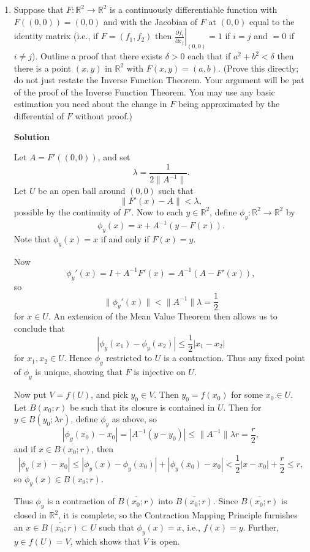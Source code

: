 \documentclass{article}
\begin{document}
\begin{enumerate}
\item Suppose that \(F : \mathbb{R}^2 \to \mathbb{R}^2\) is a continuously differentiable function with \(F((0,0)) = (0,0)\) and with the Jacobian of \(F\) at \((0,0)\) equal to the identity matrix (i.e., if \(F = (f_1, f_2)\) then \(\left. \frac{\partial f_i}{\partial x_j} \right|_{(0,0)} = 1\) if \(i = j\) and \( = 0\) if \(i \neq j\)).  Outline a proof that there exists \(\delta > 0\) each that if \(a^2 + b^2 < \delta\) then there is a point \((x,y)\) in \(\mathbb{R}^2\) with \(F(x,y) = (a,b)\).  (Prove this directly; do not just restate the Inverse Function Theorem.  Your argument will be pat of the proof of the Inverse Function Theorem.  You may use any basic estimation you need about the change in \(F\) being approximated by the differential of \(F\) without proof.)

{\bf Solution}

Let \(A = F'((0,0))\), and set
\[\lambda = \frac{1}{2\|A^{-1}\|}.\]
Let \(U\) be an open ball around \((0,0)\) such that
\[\|F'(x) - A\| < \lambda,\]
possible by the continuity of \(F'\).  Now to each \(y \in \mathbb{R}^2\), define \(\phi_y : \mathbb{R}^2 \to \mathbb{R}^2\) by
\[\phi_y(x) = x + A^{-1}(y - F(x)).\]
Note that \(\phi_y(x) = x\) if and only if \(F(x) = y\).

Now
\[\phi_y'(x) = I + A^{-1}F'(x) = A^{-1}(A - F'(x)),\]
so
\[\|\phi_y'(x)\| < \|A^{-1}\| \lambda = \frac{1}{2}\]
for \(x \in U\).  An extension of the Mean Value Theorem then allows us to conclude that
\[|\phi_y(x_1) - \phi_y(x_2)| \leq \frac{1}{2} |x_1 - x_2|\]
for \(x_1,x_2 \in U\).  Hence \(\phi_y\) restricted to \(U\) is a contraction.  Thus any fixed point of \(\phi_y\) is unique, showing that \(F\) is injective on \(U\).

Now put \(V = f(U)\), and pick \(y_0 \in V\).  Then \(y_0 = f(x_0)\) for some \(x_0 \in U\).  Let \(B(x_0;r)\) be such that its closure is contained in \(U\).  Then for \(y \in B(y_0; \lambda r)\), define \(\phi_y\) as above, so
\[\left| \phi_y(x_0) - x_0 \right|
     = \left| A^{-1}(y - y_0) \right|
  \leq \| A^{-1} \| \lambda r
     = \frac{r}{2},\]
and if \(x \in \overline{B(x_0;r)}\), then
\[\left| \phi_y(x) - x_0 \right|
  \leq \left| \phi_y(x) - \phi_y(x_0) \right| + \left| \phi_y(x_0) - x_0 \right|
     < \frac{1}{2} |x - x_0| + \frac{r}{2}
  \leq r,\]
so \(\phi_y(x) \in B(x_0;r)\).

Thus \(\phi_y\) is a contraction of \(\overline{B(x_0;r)}\) into \(\overline{B(x_0;r)}\).  Since \(\overline{B(x_0;r)}\) is closed in \(\mathbb{R}^2\), it is complete, so the Contraction Mapping Principle furnishes an \(x \in \overline{B(x_0;r)} \subset U\) such that \(\phi_y(x) = x\), i.e., \(f(x) = y\).  Further, \(y \in f(U) = V\), which shows that \(V\) is open.




\end{enumerate}
\end{document}
